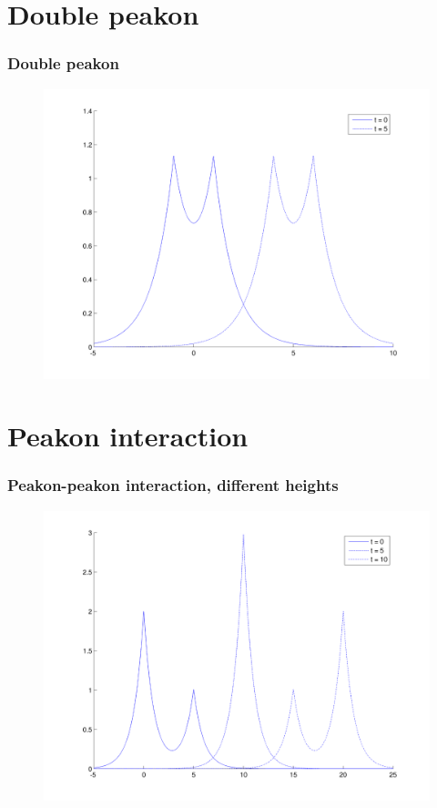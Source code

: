 \documentclass{beamer}
\begin{document}
\section{Double peakon}
\begin{frame}
\frametitle{Double peakon}

\begin{figure}
\includegraphics[width=0.8\linewidth]{gfx/doublepeakon}
\end{figure}

\end{frame}


\section{Peakon interaction}
\begin{frame}
\frametitle{Peakon-peakon interaction, different heights}

\begin{figure}
\includegraphics[width=0.8\linewidth]{gfx/peakonovertake}
\end{figure}

\end{frame}
\end{document}
